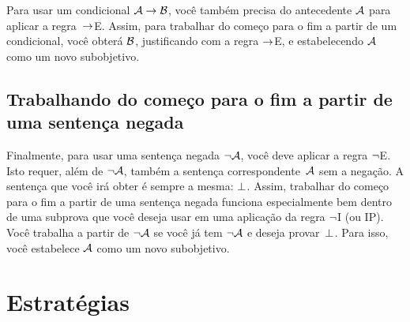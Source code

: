 Para usar um condicional $\mathcal{A} \rightarrow \mathcal{B}$, voc\^e tamb\'em precisa do antecedente $\mathcal{A}$ para aplicar a regra~$\rightarrow$E. Assim, para trabalhar do come\c co para o fim a partir de um condicional, voc\^e obter\'a $\mathcal{B}$, justificando com a regra $\rightarrow$E, e estabelecendo $\mathcal{A}$  como um  novo subobjetivo.
 

\begin{fitchproof}
	\ellipsesline 
\end{fitchproof}

\subsection*{ Trabalhando do come\c co para o fim a partir de uma senten\c ca negada}

Finalmente, para usar uma senten\c ca negada $\neg \mathcal{A}$, voc\^e deve aplicar a regra $\neg$E. Isto requer, al\'em de  $\neg \mathcal{A}$,  tamb\'em a senten\c ca correspondente~$\mathcal{A}$ sem a nega\c c\~ao. A senten\c ca que voc\^e ir\'a obter \'e sempre a mesma: $\bot$. Assim, trabalhar do come\c co para o fim a partir de uma senten\c ca negada funciona especialmente bem dentro de uma subprova que voc\^e deseja usar em uma aplicação da regra $\neg$I (ou IP).  Voc\^e trabalha a partir de $\neg \mathcal{A}$ se voc\^e j\'a tem $\neg \mathcal{A}$ e deseja provar~$\bot$. Para isso, voc\^e estabelece $\mathcal{A}$ como um novo subobjetivo.
\begin{fitchproof}
	\ellipsesline 
\end{fitchproof}


\section{Estrat\'egias }

